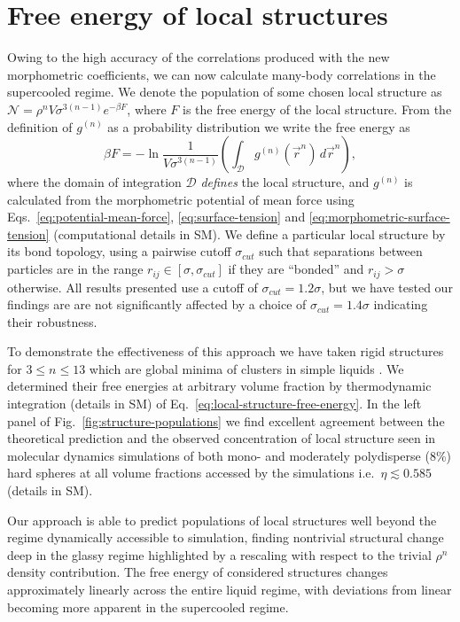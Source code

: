 \documentclass[11pt,twoside]{report}
\begin{document}
\section{Free energy of local structures}

Owing to the high accuracy of the correlations produced with the new morphometric coefficients, we can now calculate many-body correlations in the supercooled regime.
We denote the population of some chosen local structure as $\mathcal{N} = \rho^n V \sigma^{3(n-1)} e^{-\beta F}$, where $F$ is the free energy of the local structure.
From the definition of $g^{(n)}$ as a probability distribution we write the free energy as
\begin{equation}\label{eq:local-structure-free-energy}
  \beta F = -\ln{
    \frac{1}{V \sigma^{3(n-1)}}
    \left(
    \int_{\mathcal{D}}
    g^{(n)}(\vec{r}^n) \, d\vec{r}^n
    \right)
  },
\end{equation}
where the domain of integration $\mathcal{D}$ \emph{defines} the local structure, and $g^{(n)}$ is calculated from the morphometric potential of mean force using Eqs.\ \eqref{eq:potential-mean-force}, \eqref{eq:surface-tension} and \eqref{eq:morphometric-surface-tension} (computational details in SM).
We define a particular local structure by its bond topology, using a pairwise cutoff $\sigma_{cut}$ such that separations between particles are in the range $r_{ij} \in [\sigma, \sigma_{cut}]$ if they are ``bonded'' and $r_{ij} > \sigma$ otherwise.
All results presented use a cutoff of $\sigma_{cut}=1.2 \sigma$, but we have tested our findings are are not significantly affected by a choice of $\sigma_{cut}=1.4 \sigma$ indicating their robustness.

To demonstrate the effectiveness of this approach we have taken rigid structures for $3 \le n \le 13$ which are global minima of clusters in simple liquids \cite{Wales2004}.
We determined their free energies at arbitrary volume fraction by thermodynamic integration (details in SM) of Eq.\ \eqref{eq:local-structure-free-energy}.
In the left panel of Fig.\ \ref{fig:structure-populations} we find excellent agreement between the theoretical prediction and the observed concentration of local structure seen in molecular dynamics simulations of both mono- and moderately polydisperse (8\%) hard spheres at all volume fractions accessed by the simulations i.e.\ $\eta \lesssim 0.585$ (details in SM).

Our approach is able to predict populations of local structures well beyond the regime dynamically accessible to simulation, finding nontrivial structural change deep in the glassy regime highlighted by a rescaling with respect to the trivial $\rho^n$ density contribution.
The free energy of considered structures changes approximately linearly across the entire liquid regime, with deviations from linear becoming more apparent in the supercooled regime.
\end{document}
